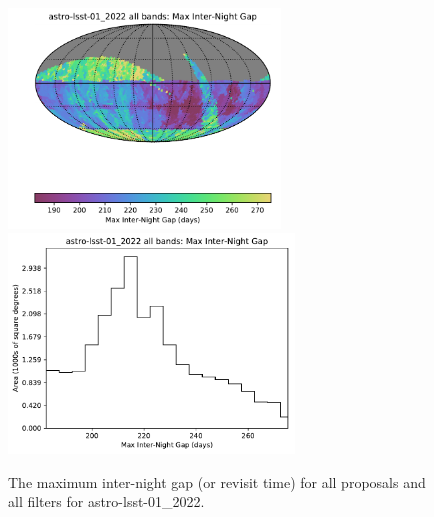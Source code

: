 \documentclass[DM,lsstdraft,authoryear,toc]{lsstdoc}
\begin{document}
\begin{figure}[htb]
\centering
\vskip -0.0in
\includegraphics[height=2.3in]{figures/astro-lsst-01_2022_Max_Inter-Night_Gap_all_bands_HEAL_SkyMap.pdf}
\includegraphics[height=2.3in]{figures/astro-lsst-01_2022_Max_Inter-Night_Gap_all_bands_HEAL_Histogram.pdf}
\vskip -0.1in
\caption{The maximum inter-night gap (or revisit time) for all proposals and all filters for astro-lsst-01\_2022.}
\label{fig:baseline_MAXGapAll}
\end{figure}




\end{document}
